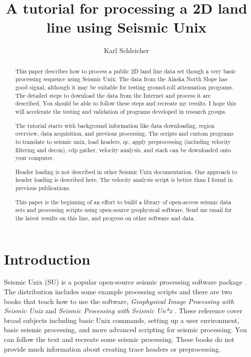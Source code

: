 
\title{A tutorial for processing a 2D land line using Seismic Unix}                                           %
\author{Karl Schleicher}

\maketitle

\begin{abstract}
This paper describes how to process a public 2D land line data set
though a very basic processing sequence using Seismic Unix. The data
from the Alaska North Slope has good signal, although it may be
suitable for testing ground-roll attenuation programs.  The detailed
steps to download the data from the Internet and process it are
described.  You should be able to follow these steps and recreate my
results.  I hope this will accelerate the testing and validation of
programs developed in research groups.
\par
The tutorial starts with background information like data downloading,
region overview, data acquisition, and previous processing.  The
scripts and custom programs to translate to seismic unix, load
headers, qc, apply preprocessing (including velocity filtering and
decon), cdp gather, velocity analysis, and stack can be downloaded
onto your computer.

Header loading is not described in other Seismic Unix documentation.
One approach to header loading is described here.  The velocity
analysis script is better than I found in previous publications.

This paper is the beginning of an effort to build a library of
open-access seismic data sets and processing scripts using open-source
geophysical software. Send me email for the latest results on this line,
and progress on other software and data.
\end{abstract}

\section{Introduction}
Seismic Unix (SU) is a popular open-source seismic processing 
software package \cite[]{TLE16-07-10451049} \cite[]{cohen}.  The 
distribution includes some example processing
scripts and there are two books that teach how to use the software,
\emph{Geophysical Image Processing with Seismic Unix} \cite[]{stockwell} 
and \emph{Seismic Processing with Seismic Un*x} \cite[]{forel}.  These 
reference cover broad subjects including basic Unix commands, setting 
up a user environment, basic seismic processing, and more advanced 
scripting for seismic processing.  You can follow the text and recreate 
some seismic processing.  These books do not provide much information 
about creating trace headers or preprocessing.\nocite{cohen}

